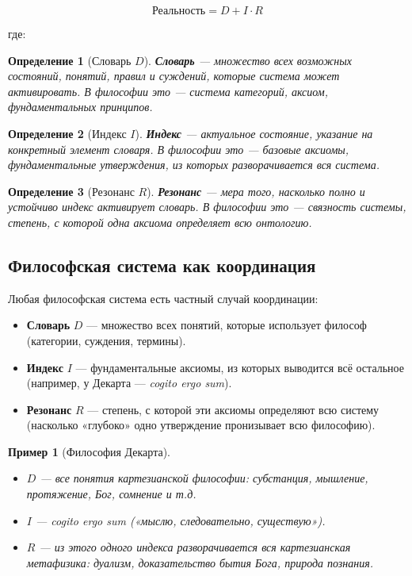\documentclass[12pt,a4paper]{article}
\newtheorem{definition}{Определение}[section]
\newtheorem{example}{Пример}[section]
\begin{document}
	\begin{equation}
		\boxed{\text{Реальность} = D + I \cdot R}
	\end{equation}
	
	где:
	
	\begin{definition}[Словарь \(D\)]
		\textbf{Словарь} — множество всех возможных состояний, понятий, правил и суждений, которые система может активировать. В философии это — система категорий, аксиом, фундаментальных принципов.
	\end{definition}
	
	\begin{definition}[Индекс \(I\)]
		\textbf{Индекс} — актуальное состояние, указание на конкретный элемент словаря. В философии это — базовые аксиомы, фундаментальные утверждения, из которых разворачивается вся система.
	\end{definition}
	
	\begin{definition}[Резонанс \(R\)]
		\textbf{Резонанс} — мера того, насколько полно и устойчиво индекс активирует словарь. В философии это — связность системы, степень, с которой одна аксиома определяет всю онтологию.
	\end{definition}
	
	\subsection{Философская система как координация}
	
	Любая философская система есть частный случай координации:
	
	\begin{itemize}
		\item \textbf{Словарь} \(D\) — множество всех понятий, которые использует философ (категории, суждения, термины).
		\item \textbf{Индекс} \(I\) — фундаментальные аксиомы, из которых выводится всё остальное (например, у Декарта — \textit{cogito ergo sum}).
		\item \textbf{Резонанс} \(R\) — степень, с которой эти аксиомы определяют всю систему (насколько «глубоко» одно утверждение пронизывает всю философию).
	\end{itemize}
	
	\begin{example}[Философия Декарта]
		\begin{itemize}
			\item \(D\) — все понятия картезианской философии: субстанция, мышление, протяжение, Бог, сомнение и т.д.
			\item \(I\) — \textit{cogito ergo sum} («мыслю, следовательно, существую»).
			\item \(R\) — из этого одного индекса разворачивается вся картезианская метафизика: дуализм, доказательство бытия Бога, природа познания.
		\end{itemize}
	\end{example}
	
\end{document}
